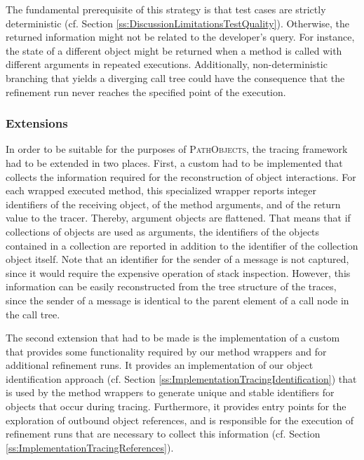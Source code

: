 The fundamental prerequisite of this strategy is that test cases are strictly deterministic (cf. Section \ref{ss:DiscussionLimitationsTestQuality}).
Otherwise, the returned information might not be related to the developer's query.
For instance, the state of a different object might be returned when a method is called with different arguments in repeated executions.
Additionally, non-deterministic branching that yields a diverging call tree could have the consequence that the refinement run never reaches the specified point of the execution.

\subsubsection{Extensions}
In order to be suitable for the purposes of \textsc{PathObjects}, the tracing framework had to be extended in two places.
First, a custom  had to be implemented that collects the information required for the reconstruction of object interactions.
For each wrapped executed method, this specialized wrapper reports integer identifiers of the receiving object, of the method arguments, and of the return value to the tracer.
Thereby, argument objects are flattened.
That means that if collections of objects are used as arguments, the identifiers of the objects contained in a collection are reported in addition to the identifier of the collection object itself.
Note that an identifier for the sender of a message is not captured, since it would require the expensive operation of stack inspection.
However, this information can be easily reconstructed from the tree structure of the traces, since the sender of a message is identical to the parent element of a call node in the call tree.

The second extension that had to be made is the implementation of a custom  that provides some functionality required by our method wrappers and for additional refinement runs.
It provides an implementation of our object identification approach (cf. Section \ref{ss:ImplementationTracingIdentification}) that is used by the method wrappers to generate unique and stable identifiers for objects that occur during tracing.
Furthermore, it provides entry points for the exploration of outbound object references, and is responsible for the execution of refinement runs that are necessary to collect this information (cf. Section \ref{ss:ImplementationTracingReferences}).

